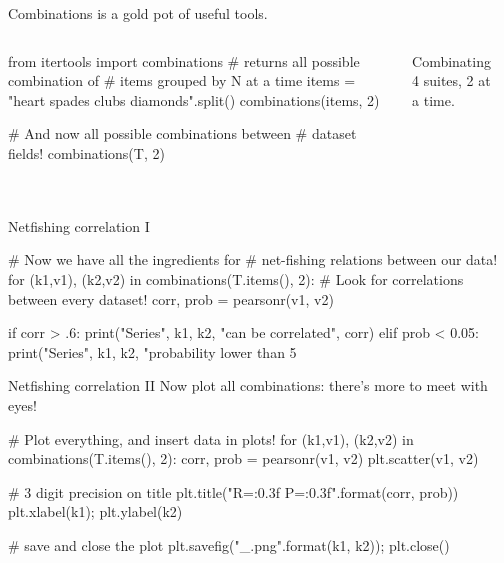 \documentclass{beamer}[10]
\begin{document}
\begin{pyframe}{Combinations}
 is a gold pot of useful tools.

\begin{columns}
\begin{pycode}
from itertools import combinations
# returns all possible combination of
#  items grouped by N at a time
items = "heart spades clubs diamonds".split()
combinations(items, 2)

# And now all possible combinations between
#  dataset fields!
combinations(T, 2)
\end{pycode}
Combinating 4 suites, 2 at a time.\\
\begin{center}
\\
\hearts \spades \\
\hearts \clubs \\
\hearts \diamonds \\
\spades \clubs \\
\spades \diamonds \\
\clubs \diamonds \\
\end{center}
\end{columns}
\end{pyframe}



\begin{pyframe}{Netfishing correlation I}
\begin{pycode}
# Now we have all the ingredients for
#  net-fishing relations between our data!
for (k1,v1), (k2,v2) in combinations(T.items(), 2):
  # Look for correlations between every dataset!
  corr, prob = pearsonr(v1, v2)

  if corr > .6:
    print("Series", k1, k2, "can be correlated", corr)
  elif prob < 0.05:
    print("Series", k1, k2, "probability lower than 5%

\end{pycode}
\end{pyframe}


\begin{pyframe}{Netfishing correlation II}
Now plot all combinations: there's more to meet with eyes!
\begin{pycode}
# Plot everything, and insert data in plots!
for (k1,v1), (k2,v2) in combinations(T.items(), 2):
    corr, prob = pearsonr(v1, v2)
    plt.scatter(v1, v2)

    # 3 digit precision on title
    plt.title("R={:0.3f} P={:0.3f}".format(corr, prob))
    plt.xlabel(k1); plt.ylabel(k2)

    # save and close the plot
    plt.savefig("{}_{}.png".format(k1, k2)); plt.close()
\end{pycode}
\end{pyframe}
\end{document}
